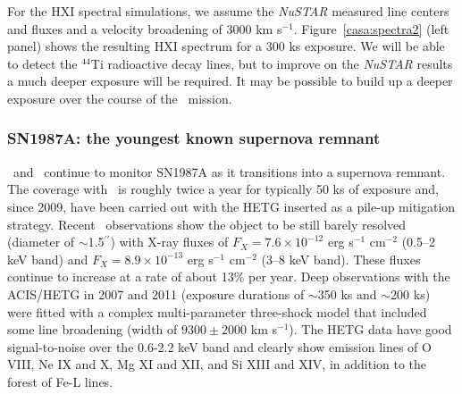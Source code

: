 \documentclass[11pt,a4paper]{article}
\begin{document}
{For the HXI spectral simulations, we assume the {\it NuSTAR} measured line
centers and fluxes \citep{casa_nustar} and a velocity broadening of
3000 km s$^{-1}$. Figure~\ref{casa:spectra2} (left panel) shows the
resulting HXI spectrum for a 300 ks exposure.  We will be able to
detect the $^{44}$Ti radioactive decay lines, but to improve on the
{\it NuSTAR} results a much deeper exposure will be required.  It may be
possible to build up a deeper exposure over the course of the
\ah\ mission.

\subsubsection{SN1987A: the youngest known supernova remnant} \label{subsec:sn87a}


\chandra\ and \xmm\ continue to monitor SN1987A as it transitions into
a supernova remnant. The coverage with \chandra\ is roughly twice a
year for typically 50 ks of exposure and, since 2009, have been
carried out with the HETG inserted as a pile-up mitigation strategy.
Recent \chandra\ observations \citep{helder13} show the object to be
still barely resolved (diameter of $\sim$1.5$^{\prime\prime}$) with
X-ray fluxes of $F_X = 7.6\times 10^{-12}$ erg s$^{-1}$ cm$^{-2}$
(0.5--2 keV band) and $F_X = 8.9\times 10^{-13}$ erg s$^{-1}$
cm$^{-2}$ (3--8 keV band).  These fluxes continue to increase at a
rate of about 13\% per year.  Deep observations with the ACIS/HETG
\citep{dewey12} in 2007 and 2011 (exposure durations of $\sim$350 ks
and $\sim$200 ks) were fitted with a complex multi-parameter
three-shock model that included some line broadening (width of $9300
\pm 2000$ km s$^{-1}$).  The HETG data have good signal-to-noise over
the 0.6-2.2 keV band and clearly show emission lines of O VIII, Ne IX
and X, Mg XI and XII, and Si XIII and XIV, in addition to the forest
of Fe-L lines.

}
\end{document}
